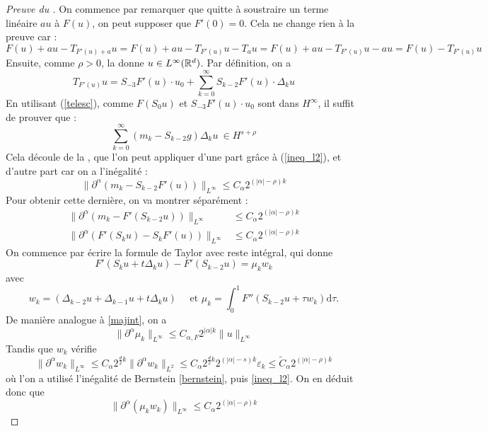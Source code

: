 \documentclass[11pt,a4paper]{article}
\begin{document}
\begin{proof}[Preuve du ]On commence par remarquer que quitte à soustraire un terme linéaire $au$ à $F(u)$, on peut supposer que $F'(0)=0$. Cela ne change rien à la preuve car :
\[F(u)+au - T_{F'(u) + a}u = F(u) + au - T_{F'(u)}u  -T_{a}u =  F(u) + au - T_{F'(u)}u  -au =  F(u) - T_{F'(u)}u \]
Ensuite, comme $\rho >0$, la  donne $u\in L^\infty(\mathbb R^d)$. Par définition, on a \[T_{F'(u)}u = S_{-3}F'(u)\cdot u_0 + \sum_{k=0}^\infty S_{k-2} F'(u)\cdot \Delta_k u \]
En utilisant (\ref{telesc}), comme $F(S_0u)$ et $S_{-3}F'(u) \cdot u_0$ sont dans $H^\infty$, il suffit de prouver que :
\[\sum_{k=0}^\infty(m_k-S_{k-2}g)\Delta_k u \ \in H^{s+\rho}\]
Cela découle de la , que l'on peut appliquer d'une part grâce à (\ref{ineq_l2}), et d'autre part car on a l'inégalité :
\begin{equation*}
\| \partial^\alpha (m_k - S_{k-2}F'(u))\|_{L^\infty} \leq C_\alpha 2^{(|\alpha|-\rho)k}
\end{equation*} 
Pour obtenir cette dernière, on va montrer séparément :
\begin{align}
\| \partial^\alpha (m_k - F'(S_{k-2}u))\|_{L^\infty} &\leq C_\alpha 2^{(|\alpha|-\rho)k} \label{eq1} \\
\| \partial^\alpha (F'(S_{k}u) - S_kF'(u))\|_{L^\infty} &\leq C_\alpha 2^{(|\alpha|-\rho)k} \label{eq2}
\end{align}
On commence par écrire la formule de Taylor avec reste intégral, qui donne 
\[F'(S_ku+t\Delta_ku)-F'(S_{k-2}u)=\mu_kw_k\]
avec 
\begin{equation*}
w_k=(\Delta_{k-2}u + \Delta_{k-1}u + t\Delta_ku) \quad \text{ et } \mu_k = \int_0^1F''(S_{k-2}u + \tau w_k)\mathrm{d}\tau.
\end{equation*}
De manière analogue à \eqref{majint}, on a 
\begin{equation*}
\|\partial^\alpha \mu_k \|_{L^\infty} \leq C_{\alpha,F} 2^{|\alpha|k} \|u\|_{L^\infty}
\end{equation*}
Tandis que $w_k$ vérifie
\begin{equation*}
\| \partial^\alpha w_k\|_{L^\infty} \leq C_{\alpha} 2^{\frac{d}{2}k} \| \partial^\alpha w_k\|_{L^2} \leq C_{\alpha} 2^{\frac{d}{2}k} 2^{(|\alpha|-s)k} \varepsilon_k  \leq \tilde{C}_{\alpha} 2^{(|\alpha|-\rho)k}
\end{equation*}
où l'on a utilisé l'inégalité de Bernstein \eqref{bernstein}, puis \eqref{ineq_l2}. On en déduit donc que 
\begin{equation*}
\|\partial^\alpha (\mu_kw_k)\|_{L^\infty} \leq C_\alpha 2^{(|\alpha|-\rho)k} 

\end{equation*}
\end{proof}
\end{document}
